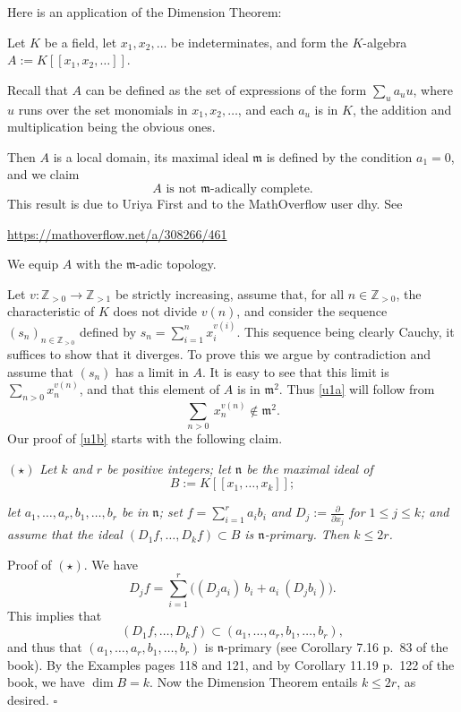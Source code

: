 \documentclass[parskip=half,fontsize=12pt]{scrartcl}%
\newcommand{\mf}{\mathfrak}
\begin{document}
Here is an application of the Dimension Theorem: 

Let $K$ be a field, let $x_1,x_2,\dots$ be indeterminates, and form the $K$-algebra  $A:=K[[x_1,x_2,\dots]]$. 

Recall that $A$ can be defined as the set of expressions of the form $\sum_ua_uu$, where $u$ runs over the set monomials in $x_1,x_2,\dots$, and each $a_u$ is in $K$, the addition and multiplication being the obvious ones. 

Then $A$ is a local domain, its maximal ideal $\mathfrak m$ is defined by the condition $a_1=0$, and we claim 
\begin{equation}\label{u1a}
\boxed{A\text{ is not }\mathfrak m\text{-adically complete.}}
\end{equation}
This result is due to Uriya First and to the MathOverflow user dhy. See \\ %

\centerline{\href{https://mathoverflow.net/a/308266/461}{https://mathoverflow.net/a/308266/461}}

We equip $A$ with the $\mf m$-adic topology.

Let $v:\mathbb Z_{>0}\to\mathbb Z_{>1}$ be strictly increasing, assume that, for all $n\in\mathbb Z_{>0}$, the characteristic of $K$ does not divide $v(n)$, and consider the sequence $(s_n)_{n\in\mathbb Z_{>0}}$ defined by $s_n=\sum_{i=1}^nx_i^{v(i)}$. This sequence being clearly Cauchy, it suffices to show that it diverges. To prove this we argue by contradiction and assume that $(s_n)$ has a limit in $A$. It is easy to see that this limit is $\sum_{n>0}x_n^{v(n)}$, and that this element of $A$ is in $\mf m^2$. Thus \eqref{u1a} will follow from 
\begin{equation}\label{u1b}
\sum_{n>0}\ x_n^{v(n)}\notin\mf m^2.
\end{equation} 
Our proof of \eqref{u1b} starts with the following claim.

$(\star)$ {\em Let $k$ and $r$ be positive integers; let $\mathfrak n$ be the maximal ideal of} 
$$
B:=K[[x_1,\dots,x_k]];
$$ 

{\em let $a_1,\dots,a_r,b_1,\dots,b_r$ be in $\mathfrak n$; set $f=\sum_{i=1}^ra_ib_i$ and $D_j:=\frac{\partial}{\partial x_j}$ for $1\le j\le k$; and assume that the ideal $(D_1f,\dots,D_kf)\subset B$ is $\mathfrak n$-primary. Then $k\le2r$.}

Proof of $(\star)$. We have 
$$
D_jf=\sum_{i=1}^r\Big((D_ja_i)\ b_i+a_i\ (D_jb_i)\Big). 
$$ 
This implies that 
$$
(D_1f,\dots,D_kf)\subset(a_1,\dots,a_r,b_1,\dots,b_r),
$$ 
and thus that $(a_1,\dots,a_r,b_1,\dots,b_r)$ is $\mathfrak n$-primary (see Corollary 7.16 p.~83 of the book). By the Examples pages 118 and 121, and by Corollary 11.19 p.~122 of the book, we have $\dim B=k$. Now the Dimension Theorem entails $k\le2r$, as desired. $\square$
\end{document}
